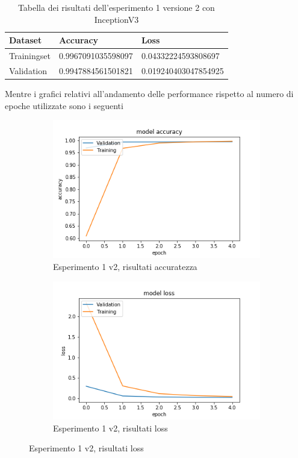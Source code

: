 \begin{table}[H]
    \begin{tabular}{|l|l|l|}
    \hline
    \textbf{Dataset}     & \textbf{Accuracy}           & \textbf{Loss}                 \\ \hline
    Trainingset & 0.9967091035598097 & 0.04332224593808697  \\ \hline
    Validation  & 0.9947884561501821 & 0.019240403047854925 \\ \hline
    \end{tabular}
   	 \caption{\label{tab:esperimento1_v2_risultati}Tabella dei risultati dell'esperimento 1 versione 2 con InceptionV3}
\end{table}

Mentre i grafici relativi all'andamento delle performance rispetto al numero di epoche utilizzate sono i seguenti
\begin{figure}[H]
    \begin{subfigure}[b]{0.5\textwidth}
        \includegraphics[width=\textwidth]{./plots/exp1_p2_acc.png}
        \caption{Esperimento 1 v2, risultati accuratezza} 
        \label{fig:plot_exp1_p2_acc}
    \end{subfigure}
    \begin{subfigure}[b]{0.5\textwidth}
        \includegraphics[width=\textwidth]{./plots/exp1_p2_loss.png}
        \caption{Esperimento 1 v2, risultati loss} 
        \label{fig:plot_exp1_p2_loss}
	\end{subfigure}
\end{figure}
